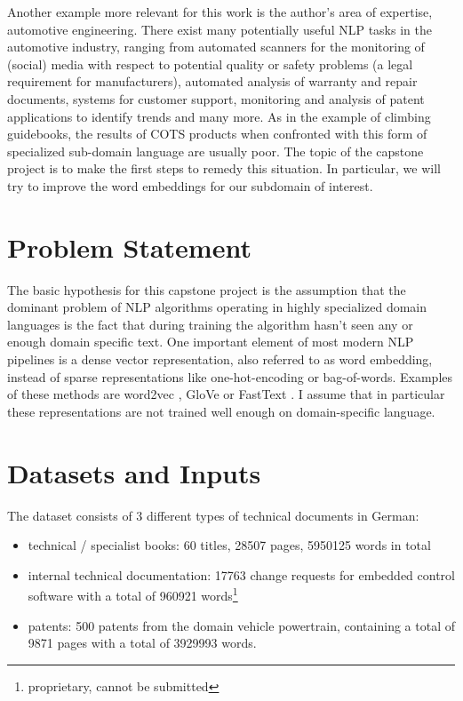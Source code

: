 \documentclass[10pt,a4paper]{article}
\begin{document}
	Another example more relevant for this work is the author's area of expertise, automotive engineering. There exist many potentially useful NLP tasks in the automotive industry, ranging from automated scanners for the monitoring of (social) media with respect to potential quality or safety problems (a legal requirement for manufacturers), automated analysis of warranty and repair documents, systems for customer support, monitoring and analysis of patent applications to identify trends and many more.
	As in the example of climbing guidebooks, the results of COTS products when confronted with this form of specialized sub-domain language are usually poor. 
	The topic of the capstone project is to make the first steps to remedy this situation. In particular, we will try to improve the word embeddings for our subdomain of interest.
	
	\section{Problem Statement}
	The basic hypothesis for this capstone project is the assumption that the dominant problem of NLP algorithms operating in highly specialized domain languages is the fact that during training the algorithm hasn't seen any or enough domain specific text. 
	One important element of most modern NLP pipelines is a dense vector representation, also referred to as word embedding, instead of sparse representations like one-hot-encoding or bag-of-words. Examples of these methods are word2vec \cite{word2vec}, GloVe \cite{pennington2014glove} or FastText \cite{bojanowski2017enriching}. I assume that in particular these representations are not trained well enough on domain-specific language. 
	
	\section{Datasets and Inputs}
	The dataset consists of 3 different types of technical documents in German:
	\begin{itemize}
		\item technical / specialist books: 60 titles, 28507 pages, 5950125 words in total 
		\item internal technical documentation: 17763 change requests for embedded control software with a total of 960921 words\footnote{proprietary, cannot be submitted} 
		\item patents: 500 patents from the domain vehicle powertrain, containing a total of 9871 pages with a total of 3929993 words.
	\end{itemize}
\end{document}
